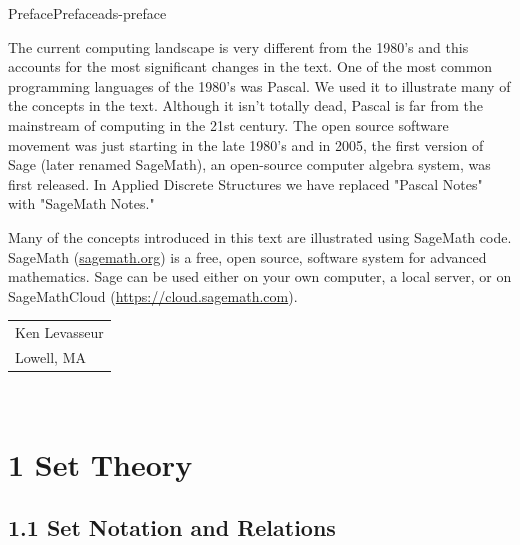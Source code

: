 \documentclass[twoside,10pt,]{book}
\numberwithin{equation}{section}
\begin{document}
\begin{preface}{Preface}{}{Preface}{}{}{ads-preface}
\par
\hypertarget{p-143}{}%
The current computing landscape is very different from the 1980's and this accounts for the most significant changes in the text. One of the most common programming languages of the 1980's was Pascal.  We used it to illustrate many of the concepts in the text.  Although it isn't totally dead, Pascal is far from the mainstream of computing in the 21st century.  The open source software movement was just starting in the late 1980's and in 2005, the first version of Sage (later renamed SageMath), an open-source computer algebra system, was first released. In Applied Discrete Structures we have replaced "Pascal Notes" with "SageMath Notes."%
\par
\hypertarget{p-144}{}%
Many of the concepts introduced in this text are illustrated using SageMath code.  SageMath (\href{http://sagemath.org}{sagemath.org}) is a free, open source, software system for advanced mathematics.  Sage can be used either on your own computer, a local server, or on SageMathCloud (\href{https://cloud.sagemath.com}{https:\slash{}\slash{}cloud.sagemath.com}).%
\nopagebreak\par%
\hfill\begin{tabular}{l@{}}
Ken Levasseur\\
Lowell, MA
\end{tabular}\\\par
\end{preface}
\setcounter{tocdepth}{1}
\renewcommand*\contentsname{Contents}
\tableofcontents
\mainmatter
\chapter*{1 Set Theory}
\section*{1.1 Set Notation and Relations}
\end{document}
